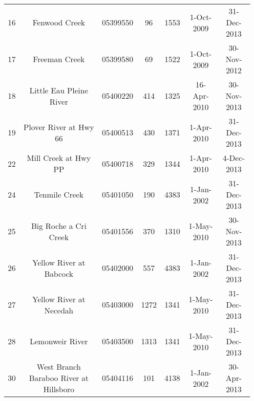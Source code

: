 \begin{table}[h]
\begin{tabular}{l c ccccc}
16	&	Fenwood Creek                          & 05399550                    & 96                                      & 1553                              & 1-Oct-2009                     & 31-Dec-2013                  \\
17	&	Freeman Creek                          & 05399580                    & 69                                      & 1522                              & 1-Oct-2009                     & 30-Nov-2012                  \\
18	&	Little Eau Pleine River                & 05400220                    & 414                                     & 1325                              & 16-Apr-2010                    & 30-Nov-2013                  \\
19	&	Plover River at Hwy 66                 & 05400513                    & 430                                     & 1371                              & 1-Apr-2010                     & 31-Dec-2013                  \\
22	&	Mill  Creek at Hwy PP                  & 05400718                    & 329                                     & 1344                              & 1-Apr-2010                     & 4-Dec-2013                   \\
24	&	Tenmile Creek                          & 05401050                    & 190                                     & 4383                              & 1-Jan-2002                     & 31-Dec-2013                  \\
25	&	Big Roche a Cri Creek                  & 05401556                    & 370                                     & 1310                              & 1-May-2010                     & 30-Nov-2013                  \\
26	&	Yellow River at Babcock                & 05402000                    & 557                                     & 4383                              & 1-Jan-2002                     & 31-Dec-2013                  \\
27	&	Yellow  River at Necedah               & 05403000                    & 1272                                    & 1341                              & 1-May-2010                     & 31-Dec-2013                  \\
28	&	Lemonweir River                        & 05403500                    & 1313                                    & 1341                              & 1-May-2010                     & 31-Dec-2013                  \\
30	&	West Branch Baraboo River at Hillsboro & 05404116                    & 101                                     & 4138                              & 1-Jan-2002                     & 30-Apr-2013                  \\

\end{tabular}
\end{table}
